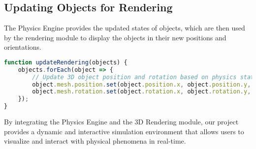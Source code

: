 \subsection{Updating Objects for Rendering}

The Physics Engine provides the updated states of objects, which are then used by the rendering module to display the objects in their new positions and orientations.

\begin{lstlisting}[language=JavaScript, caption=Updating Object States for Rendering]
function updateRendering(objects) {
    objects.forEach(object => {
        // Update 3D object position and rotation based on physics state
        object.mesh.position.set(object.position.x, object.position.y, object.position.z);
        object.mesh.rotation.set(object.rotation.x, object.rotation.y, object.rotation.z);
    });
}
\end{lstlisting}

By integrating the Physics Engine and the 3D Rendering module, our project provides a dynamic and interactive simulation environment that allows users to visualize and interact with physical phenomena in real-time.
